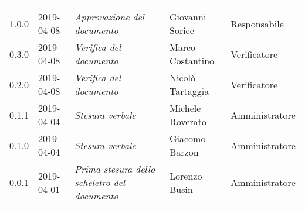 \newpage 
\section*{}
\begin{longtable}{C{2cm}|C{2.5cm}|C{4.5cm}|C{2.5cm}|C{3cm}}
	
	 &  &  &  &   \\
	\endhead
	
	1.0.0 & 2019-04-08 &  \emph{Approvazione del documento} & Giovanni Sorice  & Responsabile\\
	\hline
	
	0.3.0 & 2019-04-08 & \emph{Verifica del documento} & Marco Costantino & Verificatore \\
	\hline
	
	0.2.0 & 2019-04-08 & \emph{Verifica del documento} & Nicolò Tartaggia & Verificatore \\
	\hline
	
	0.1.1 & 2019-04-04 & \emph{Stesura verbale} & Michele Roverato & Amministratore \\
	\hline
	
	0.1.0 & 2019-04-04 & \emph{Stesura verbale} & Giacomo Barzon & Amministratore \\
	\hline
	
	0.0.1 & 2019-04-01 & \emph{Prima stesura dello scheletro del documento} & Lorenzo Busin & Amministratore \\
	
\end{longtable}


\clearpage